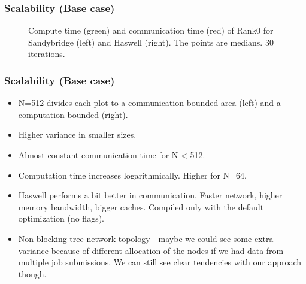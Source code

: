 \documentclass[10pt, compress]{beamer}
\begin{document}
\begin{frame}
  \frametitle{Scalability (Base case)}
  \begin{figure}
  \centering
  \caption{Compute time (green) and communication time (red) of Rank0 for Sandybridge (left) and Haswell (right). The points are medians. 30 iterations.}
  \label{fig:times_provided}
  \end{figure}
\end{frame}

\begin{frame}
  \frametitle{Scalability (Base case)}
  \begin{itemize}
  \item N=512 divides each plot to a communication-bounded area (left) and a computation-bounded (right).
  \item Higher variance in smaller sizes.
  \item Almost constant communication time for N < 512.
  \item Computation time increases logarithmically. Higher for N=64.
  \item Haswell performs a bit better in communication. Faster network, higher memory bandwidth, bigger caches. Compiled only with the default optimization (no flags).
  \item Non-blocking tree network topology - maybe we could see some extra variance because of different allocation of the nodes if we had data from multiple job submissions. We can still see clear tendencies with our approach though.
  \end{itemize}
\end{frame}
\end{document}
